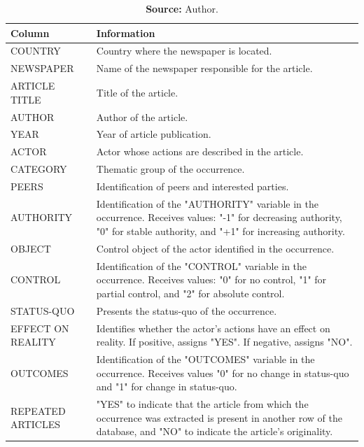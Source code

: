 \begin{table}[ht]
    \centering
    \caption{\textbf{Database Columns for This Research}}
    \label{tab:database_columns}
    \begin{tabular}{lp{10cm}}
        \toprule
        \textbf{Column} & \textbf{Information} \\
        \midrule
        COUNTRY & Country where the newspaper is located. \\
        NEWSPAPER & Name of the newspaper responsible for the article. \\
        ARTICLE TITLE & Title of the article. \\
        AUTHOR & Author of the article. \\
        YEAR & Year of article publication. \\
        ACTOR & Actor whose actions are described in the article. \\
        CATEGORY & Thematic group of the occurrence. \\
        PEERS & Identification of peers and interested parties. \\
        AUTHORITY & Identification of the "AUTHORITY" variable in the occurrence. Receives values: "-1" for decreasing authority, "0" for stable authority, and "+1" for increasing authority. \\
        OBJECT & Control object of the actor identified in the occurrence. \\
        CONTROL & Identification of the "CONTROL" variable in the occurrence. Receives values: "0" for no control, "1" for partial control, and "2" for absolute control. \\
        STATUS-QUO & Presents the status-quo of the occurrence. \\
        EFFECT ON REALITY & Identifies whether the actor's actions have an effect on reality. If positive, assigns "YES". If negative, assigns "NO". \\
        OUTCOMES & Identification of the "OUTCOMES" variable in the occurrence. Receives values "0" for no change in status-quo and "1" for change in status-quo. \\
        REPEATED ARTICLES & "YES" to indicate that the article from which the occurrence was extracted is present in another row of the database, and "NO" to indicate the article's originality. \\
        \bottomrule
    \end{tabular}
    
    \caption*{\textbf{Source:} Author.}
\end{table}

